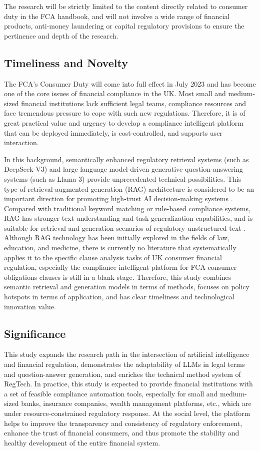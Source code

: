 \documentclass[a4paper,11pt]{article}
\begin{document}
The research will be strictly limited to the content directly related to consumer duty in the FCA handbook, and will not involve a wide range of financial products, anti-money laundering or capital regulatory provisions to ensure the pertinence and depth of the research.

\subsection{Timeliness and Novelty}

The FCA's Consumer Duty will come into full effect in July 2023 and has become one of the core issues of financial compliance in the UK. Most small and medium-sized financial institutions lack sufficient legal teams, compliance resources and face tremendous pressure to cope with such new regulations. Therefore, it is of great practical value and urgency to develop a compliance intelligent platform that can be deployed immediately, is cost-controlled, and supports user interaction.

In this background, semantically enhanced regulatory retrieval systems (such as DeepSeek-V3) and large language model-driven generative question-answering systems (such as Llama 3) provide unprecedented technical possibilities. This type of retrieval-augmented generation (RAG) architecture is considered to be an important direction for promoting high-trust AI decision-making systems \cite{lewis2020rag}. Compared with traditional keyword matching or rule-based compliance systems, RAG has stronger text understanding and task generalization capabilities, and is suitable for retrieval and generation scenarios of regulatory unstructured text \cite{arner2017regtech}. Although RAG technology has been initially explored in the fields of law, education, and medicine, there is currently no literature that systematically applies it to the specific clause analysis tasks of UK consumer financial regulation, especially the compliance intelligent platform for FCA consumer obligations clauses is still in a blank stage. Therefore, this study combines semantic retrieval and generation models in terms of methods, focuses on policy hotspots in terms of application, and has clear timeliness and technological innovation value.

\subsection{Significance}

This study expands the research path in the intersection of artificial intelligence and financial regulation, demonstrates the adaptability of LLMs in legal terms and question-answer generation, and enriches the technical method system of RegTech. In practice, this study is expected to provide financial institutions with a set of feasible compliance automation tools, especially for small and medium-sized banks, insurance companies, wealth management platforms, etc., which are under resource-constrained regulatory response. At the social level, the platform helps to improve the transparency and consistency of regulatory enforcement, enhance the trust of financial consumers, and thus promote the stability and healthy development of the entire financial system.
\end{document}

